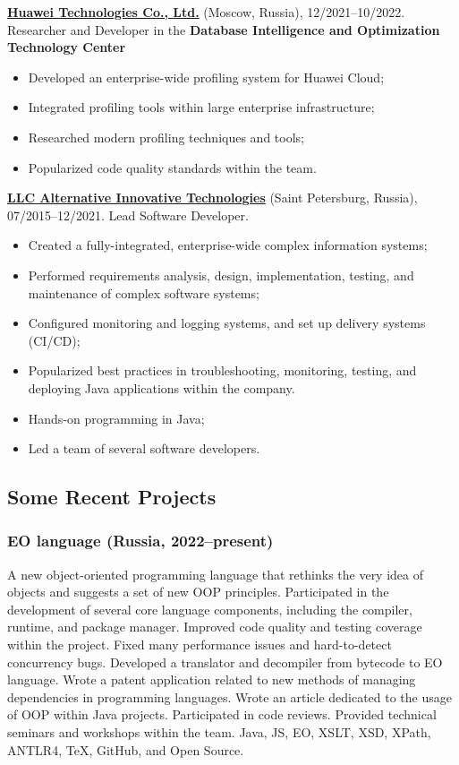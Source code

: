 \documentclass{vl}
\begin{document}
    \textbf{\href{https://www.huawei.com}{Huawei Technologies Co., Ltd.}} (Moscow, Russia), 12/2021--10/2022.
    Researcher and Developer in the \textbf{Database Intelligence and Optimization Technology Center}

    \begin{itemize}
        \itemsep0em
        \item Developed an enterprise-wide profiling system for Huawei Cloud;
        \item Integrated profiling tools within large enterprise infrastructure;
        \item Researched modern profiling techniques and tools;
        \item Popularized code quality standards within the team.
    \end{itemize}

    \textbf{\href{https://altinntech.com/en/}{LLC Alternative Innovative Technologies}} (Saint Petersburg, Russia),
    07/2015--12/2021.
    Lead Software Developer.

    \begin{itemize}
        \itemsep0em
        \item Created a fully-integrated, enterprise-wide complex information systems;
        \item Performed requirements analysis, design, implementation, testing, and maintenance of complex software
        systems;
        \item Configured monitoring and logging systems, and set up delivery systems (CI/CD);
        \item Popularized best practices in troubleshooting, monitoring, testing, and deploying Java applications
        within the company.
        \item Hands-on programming in Java;
        \item Led a team of several software developers.
    \end{itemize}

    \subsection*{Some Recent Projects}

    \subsubsection*{EO language (Russia, 2022--present)}
    A new object-oriented programming language
    that rethinks the very idea of objects and suggests a set of new OOP principles.
    Participated in the development of several core language components,
    including the compiler, runtime, and package manager.
    Improved code quality and testing coverage within the project.
    Fixed many performance issues and hard-to-detect concurrency bugs.
    Developed a translator and decompiler from bytecode to EO language.
    Wrote a patent application related to new methods of managing dependencies in programming languages.
    Wrote an article dedicated to the usage of OOP within Java projects.
    Participated in code reviews.
    Provided technical seminars and workshops within the team.
    Java, JS, EO, XSLT, XSD, XPath, ANTLR4, TeX, GitHub, and Open Source.
\end{document}
